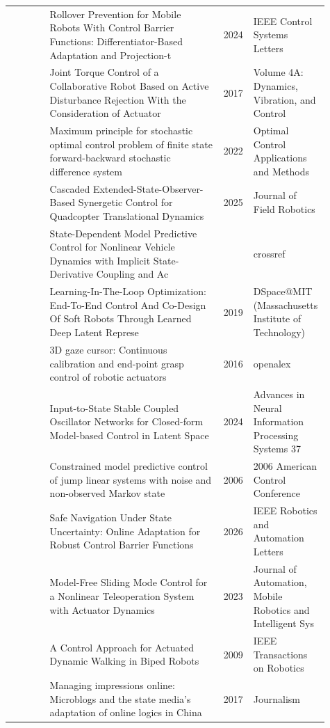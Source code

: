 \documentclass{article}
\begin{document}
\begin{center}
\begin{longtable}{p{0.12\linewidth}p{0.53\linewidth}p{0.08\linewidth}p{0.18\linewidth}}
\citep{pool86_07} & Rollover Prevention for Mobile Robots With Control Barrier Functions: Differentiator-Based Adaptation and Projection-t & 2024 & IEEE Control Systems Letters\\
\citep{pool86_08} & Joint Torque Control of a Collaborative Robot Based on Active Disturbance Rejection With the Consideration of Actuator & 2017 & Volume 4A: Dynamics, Vibration, and Control\\
\citep{pool86_09} & Maximum principle for stochastic optimal control problem of finite state forward-backward stochastic difference system & 2022 & Optimal Control Applications and Methods\\
\citep{pool86_10} & Cascaded Extended-State-Observer-Based Synergetic Control for Quadcopter Translational Dynamics & 2025 & Journal of Field Robotics\\
\citep{pool86_11} & State-Dependent Model Predictive Control for Nonlinear Vehicle Dynamics with Implicit State-Derivative Coupling and Ac &  & crossref\\
\citep{pool86_12} & Learning-In-The-Loop Optimization: End-To-End Control And Co-Design Of Soft Robots Through Learned Deep Latent Represe & 2019 & DSpace@MIT (Massachusetts Institute of Technology)\\
\citep{pool86_13} & 3D gaze cursor: Continuous calibration and end-point grasp control of robotic actuators & 2016 & openalex\\
\citep{pool86_14} & Input-to-State Stable Coupled Oscillator Networks for Closed-form Model-based Control in Latent Space & 2024 & Advances in Neural Information Processing Systems 37\\
\citep{pool86_15} & Constrained model predictive control of jump linear systems with noise and non-observed Markov state & 2006 & 2006 American Control Conference\\
\citep{pool86_16} & Safe Navigation Under State Uncertainty: Online Adaptation for Robust Control Barrier Functions & 2026 & IEEE Robotics and Automation Letters\\
\citep{pool86_17} & Model-Free Sliding Mode Control for a Nonlinear Teleoperation System with Actuator Dynamics & 2023 & Journal of Automation, Mobile Robotics and Intelligent Sys\\
\citep{pool86_18} & A Control Approach for Actuated Dynamic Walking in Biped Robots & 2009 & IEEE Transactions on Robotics\\
\citep{pool86_19} & Managing impressions online: Microblogs and the state media's adaptation of online logics in China & 2017 & Journalism\\

\end{longtable}
\end{center}
\end{document}
